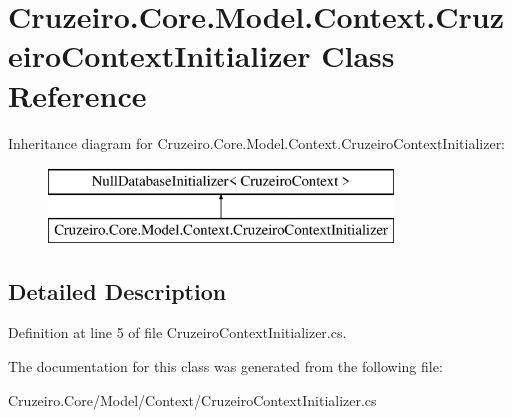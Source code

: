 \hypertarget{class_cruzeiro_1_1_core_1_1_model_1_1_context_1_1_cruzeiro_context_initializer}{}\section{Cruzeiro.\+Core.\+Model.\+Context.\+Cruzeiro\+Context\+Initializer Class Reference}
\label{class_cruzeiro_1_1_core_1_1_model_1_1_context_1_1_cruzeiro_context_initializer}
Inheritance diagram for Cruzeiro.\+Core.\+Model.\+Context.\+Cruzeiro\+Context\+Initializer\+:\begin{figure}[H]
\begin{center}
\leavevmode
\includegraphics[height=2.000000cm]{class_cruzeiro_1_1_core_1_1_model_1_1_context_1_1_cruzeiro_context_initializer}
\end{center}
\end{figure}


\subsection{Detailed Description}


Definition at line 5 of file Cruzeiro\+Context\+Initializer.\+cs.



The documentation for this class was generated from the following file\+:\begin{DoxyCompactItemize}
\item 
Cruzeiro.\+Core/\+Model/\+Context/Cruzeiro\+Context\+Initializer.\+cs\end{DoxyCompactItemize}
